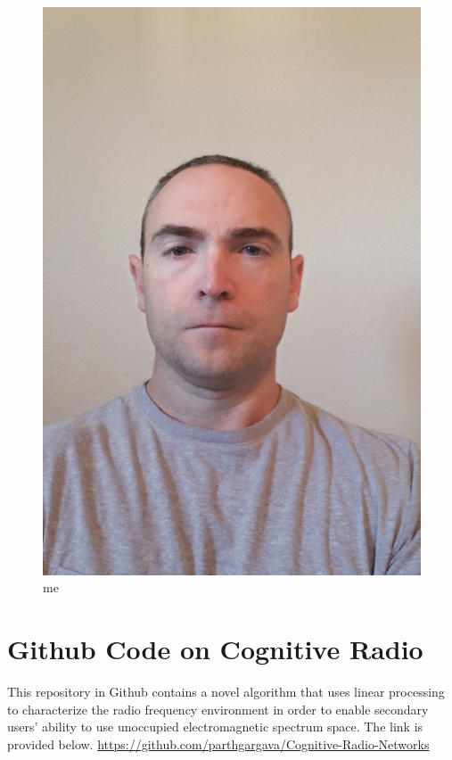 \documentclass{article}
\begin{document}
\begin{figure}
    \centering
    \includegraphics[scale=.25]{self pic2.jpg}
    \caption{me}
    \label{fig:me}
\end{figure}
\newpage
\section{Github Code on Cognitive Radio}
This repository in Github contains a novel algorithm that uses linear processing to characterize the radio frequency environment in order to enable secondary users' ability to use unoccupied electromagnetic spectrum space.  The link is provided below.
\url{https://github.com/parthgargava/Cognitive-Radio-Networks}
\end{document}
